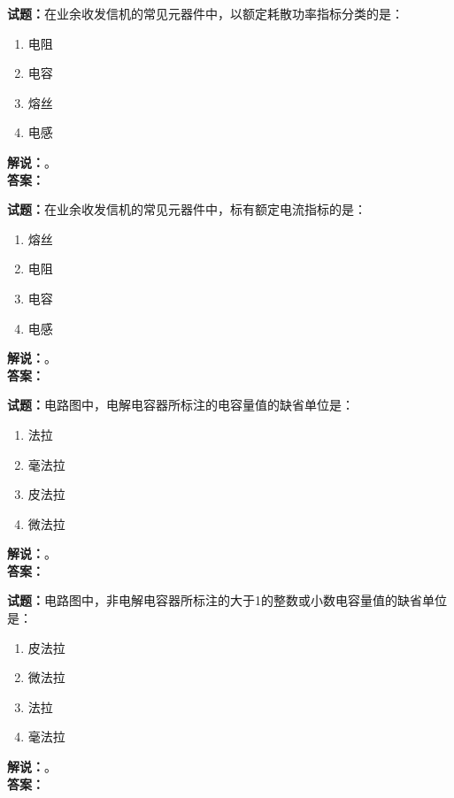 \documentclass{ctexbook}
\begin{document}
\vspace{\baselineskip}

\noindent\textbf{试题：}在业余收发信机的常见元器件中，以额定耗散功率指标分类的是：
\begin{enumerate}[leftmargin=3em]
  \item 电阻
  \item 电容
  \item 熔丝
  \item 电感
\end{enumerate}
\noindent\textbf{解说：}\textbf{}。\\\noindent\textbf{答案：}

\vspace{\baselineskip}

\noindent\textbf{试题：}在业余收发信机的常见元器件中，标有额定电流指标的是：
\begin{enumerate}[leftmargin=3em]
  \item 熔丝
  \item 电阻
  \item 电容
  \item 电感
\end{enumerate}
\noindent\textbf{解说：}\textbf{}。\\\noindent\textbf{答案：}

\vspace{\baselineskip}

\noindent\textbf{试题：}电路图中，电解电容器所标注的电容量值的缺省单位是：
\begin{enumerate}[leftmargin=3em]
  \item 法拉
  \item 毫法拉
  \item 皮法拉
  \item 微法拉
\end{enumerate}
\noindent\textbf{解说：}\textbf{}。\\\noindent\textbf{答案：}

\vspace{\baselineskip}

\noindent\textbf{试题：}电路图中，非电解电容器所标注的大于1的整数或小数电容量值的缺省单位是：
\begin{enumerate}[leftmargin=3em]
  \item 皮法拉
  \item 微法拉
  \item 法拉
  \item 毫法拉
\end{enumerate}
\noindent\textbf{解说：}\textbf{}。\\\noindent\textbf{答案：}
\end{document}
